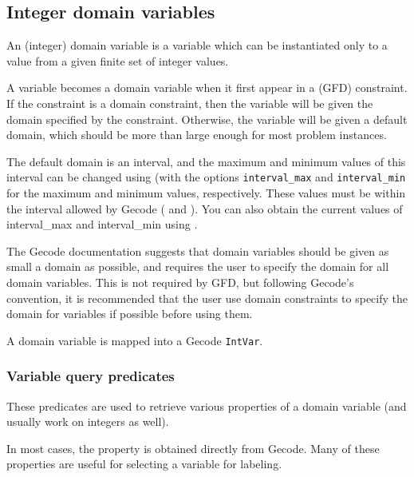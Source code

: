 \subsection{Integer domain variables}

An (integer) domain variable is a variable which can be instantiated only to a
value from a given finite set of integer values. 

A variable becomes a domain variable when it first appear in a (GFD) 
constraint. If the constraint is a domain constraint, then the variable will
be given the domain specified by the constraint. Otherwise, the variable will
be given a default domain, which should be more than large enough for
most problem instances. 

The default domain is an interval, and the maximum and minimum values of this
interval can be changed using  (with the options 
{\tt interval_max} and {\tt interval_min} for the maximum and minimum values,
respectively. These values must be within the interval allowed by Gecode
( and ). You can also obtain the current values
of interval_max and interval_min using .

The Gecode documentation suggests that domain variables should be given as
small a domain as possible, and requires the user to specify the domain for 
all domain variables. This is not required by GFD, but following Gecode's
convention, it is recommended that the user use domain constraints to specify 
the domain for variables if possible before using them.

A domain variable is mapped into a Gecode \verb'IntVar'.

\subsubsection{Variable query predicates}
\label{gfdvarquery}

These predicates are used to retrieve various properties of a domain variable 
(and usually work on integers as well). 

In most cases, the property is obtained directly from Gecode. Many of these
properties are useful for selecting a variable for labeling.

